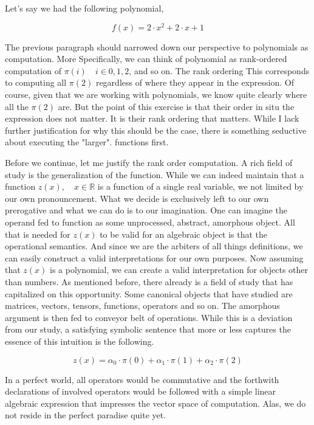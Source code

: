 Let's say we had the following polynomial,

\begin{equation}
    f(x) = 2 \cdot x^2 + 2 \cdot x + 1
\end{equation}

The previous paragraph should narrowed down our perspective to polynomials as
computation. More Specifically, we can think of polynomial as rank-ordered
computation of $\pi(i) \quad i \in {0,1,2} $, and so on. The rank ordering This
corresponds to computing all $\pi(2)$ regardless of where they appear in the
expression. Of course, given that we are working with polynomials, we know
quite clearly where all the $\pi(2)$ are. But the point of this exercise is
that their order in situ the expression does not matter. It is their rank
ordering that matters. While I lack further justification for why this should
be the case, there is something seductive about executing the "larger".
functions first.

Before we continue, let me justify the rank order computation. A rich field of
study is the generalization of the function. While we can indeed maintain that
a function $z(x), \quad x \in \mathbb{R}$ is a function of a single real
variable, we not limited by our own pronouncement. What we decide is
exclusively left to our own prerogative and what we can do is to our
imagination. One can imagine the operand fed to function as some unprocessed,
abstract, amorphous object. All that is needed for $z(x)$ to be valid for an
algebraic object is that the operational semantics. And since we are the
arbiters of all things definitions, we can easily construct a valid
interpretations for our own purposes. Now assuming that $z(x)$ is a polynomial,
we can create a valid interpretation for objects other than numbers. As
mentioned before, there already is a field of study that has capitalized on
this opportunity. Some canonical objects that have studied are matrices,
vectors, tensors, functions, operators and so on. The amorphous argument is
then fed to conveyor belt of operations. While this is a deviation from our
study, a satisfying symbolic sentence that more or less captures the essence of
this intuition is the following.

\begin{equation}
    z(x) = \alpha_0 \cdot \pi(0) + \alpha_1 \cdot \pi(1) + \alpha_2 \cdot \pi(2)
\end{equation}

In a perfect world, all operators would be commutative and the forthwith
declarations of involved operators would be followed with a simple linear
algebraic expression that impresses the vector space of computation. Alas, we
do not reside in the perfect paradise quite yet.

